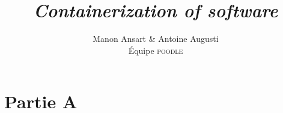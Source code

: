 \documentclass[a4paper, 12pt, french, titlepage]{scrartcl}
\title{\textit{Containerization of software}}
\author{Manon Ansart \& Antoine Augusti\\Équipe \textsc{poodle}}
\date{}
\begin{document}
    \maketitle

    \section*{Partie A}
        
\end{document}
